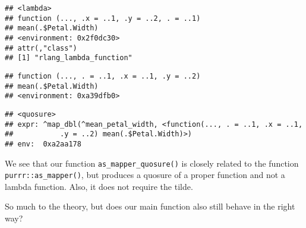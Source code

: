 \documentclass[]{book}
\newenvironment{Shaded}{\begin{snugshade}}{\end{snugshade}}
\newcommand{\DataTypeTok}[1]{\textcolor[rgb]{0.13,0.29,0.53}{#1}}
\newcommand{\KeywordTok}[1]{\textcolor[rgb]{0.13,0.29,0.53}{\textbf{#1}}}
\newcommand{\NormalTok}[1]{#1}
\newcommand{\OperatorTok}[1]{\textcolor[rgb]{0.81,0.36,0.00}{\textbf{#1}}}
\newcommand{\StringTok}[1]{\textcolor[rgb]{0.31,0.60,0.02}{#1}}
\begin{document}
\begin{verbatim}
## <lambda>
## function (..., .x = ..1, .y = ..2, . = ..1) 
## mean(.$Petal.Width)
## <environment: 0x2f0dc30>
## attr(,"class")
## [1] "rlang_lambda_function"
\end{verbatim}

\begin{Shaded}
\end{Shaded}

\begin{verbatim}
## function (..., . = ..1, .x = ..1, .y = ..2) 
## mean(.$Petal.Width)
## <environment: 0xa39dfb0>
\end{verbatim}

\begin{Shaded}
\end{Shaded}

\begin{verbatim}
## <quosure>
## expr: ^map_dbl(^mean_petal_width, <function(..., . = ..1, .x = ..1,
##           .y = ..2) mean(.$Petal.Width)>)
## env:  0xa2aa178
\end{verbatim}

We see that our function \texttt{as\_mapper\_quosure()} is closely related to the function \texttt{purrr::as\_mapper()}, but produces a quosure of a proper function and not a lambda function.
Also, it does not require the tilde.

So much to the theory, but does our main function also still behave in the right way?

\begin{Shaded}
\end{Shaded}
\end{document}
